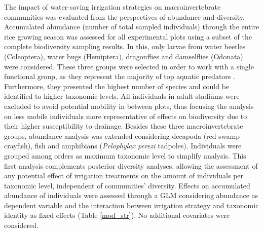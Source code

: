 The impact of water-saving irrigation strategies on macroinvertebrate communities was evaluated from the perspectives of abundance and diversity. Accumulated abundance (number of total sampled individuals) through the entire rice growing season was assessed for all experimental plots using a subset of the complete biodiversity sampling results. In this, only larvae from water beetles (Coleoptera), water bugs (Hemiptera), dragonflies and damselflies (Odonata) were considered. These three groups were selected in order to work with a single functional group, as they represent the majority of top aquatic predators \citep{lawler2001}. Furthermore, they presented the highest number of species and could be identified to higher taxonomic levels. All individuals in adult stadiums were excluded to avoid potential mobility in between plots, thus focusing the analysis on less mobile individuals more representative of effects on biodiversity due to their higher susceptibility to drainage. Besides these three macroinvertebrate groups, abundance analysis was extended considering decapoda (red swamp crayfish), fish and amphibians (\textit{Pelophylax perezi} tadpoles). Individuals were grouped among orders as maximum taxonomic level to simplify analysis. This first analysis complements posterior diversity analyses, allowing the assessment of any potential effect of irrigation treatments on the amount of individuals per taxonomic level, independent of communities' diversity.  Effects on accumulated abundance of individuals were assessed through a GLM considering abundance as dependent variable and the interaction between irrigation strategy and taxonomic identity as fixed effects (Table \ref{mod_str}). No additional covariates were considered.\\ 

